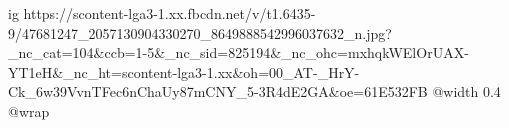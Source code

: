  
 
 
 
 

\ifcmt
  ig https://scontent-lga3-1.xx.fbcdn.net/v/t1.6435-9/47681247_2057130904330270_8649888542996037632_n.jpg?_nc_cat=104&ccb=1-5&_nc_sid=825194&_nc_ohc=mxhqkWElOrUAX-YT1eH&_nc_ht=scontent-lga3-1.xx&oh=00_AT-_HrY-Ck_6w39VvnTFec6nChaUy87mCNY_5-3R4dE2GA&oe=61E532FB
  @width 0.4
  @wrap 
\fi
